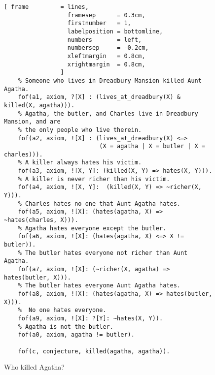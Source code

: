 \begin{figure}[!ht]
\centering
\begin{Verbatim}[ frame         = lines, 
                  framesep      = 0.3cm, 
                  firstnumber   = 1,
                  labelposition = bottomline,
                  numbers       = left,
                  numbersep     = -0.2cm,
                  xleftmargin   = 0.8cm,
                  xrightmargin  = 0.8cm,
                ]
    % Someone who lives in Dreadbury Mansion killed Aunt Agatha.
    fof(a1, axiom, ?[X] : (lives_at_dreadbury(X) & killed(X, agatha))).
    % Agatha, the butler, and Charles live in Dreadbury Mansion, and are 
    % the only people who live therein.
    fof(a2, axiom, ![X] : (lives_at_dreadbury(X) <=>
                           (X = agatha | X = butler | X = charles))).
    % A killer always hates his victim.
    fof(a3, axiom, ![X, Y]: (killed(X, Y) => hates(X, Y))).
    % A killer is never richer than his victim.
    fof(a4, axiom, ![X, Y]:  (killed(X, Y) => ~richer(X, Y))).
    % Charles hates no one that Aunt Agatha hates.
    fof(a5, axiom, ![X]: (hates(agatha, X) => ~hates(charles, X))).
    % Agatha hates everyone except the butler.
    fof(a6, axiom, ![X]: (hates(agatha, X) <=> X != butler)).
    % The butler hates everyone not richer than Aunt Agatha.
    fof(a7, axiom, ![X]: (~richer(X, agatha) => hates(butler, X))).
    % The butler hates everyone Aunt Agatha hates.
    fof(a8, axiom, ![X]: (hates(agatha, X) => hates(butler, X))).
    %  No one hates everyone.
    fof(a9, axiom, ![X]: ?[Y]: ~hates(X, Y)).
    % Agatha is not the butler.
    fof(a0, axiom, agatha != butler).

    fof(c, conjecture, killed(agatha, agatha)).
\end{Verbatim}
\vspace*{-0.3cm}
\caption{Who killed Agatha?}
\label{fig:who-killed-agatha.tptp}
\end{figure}


